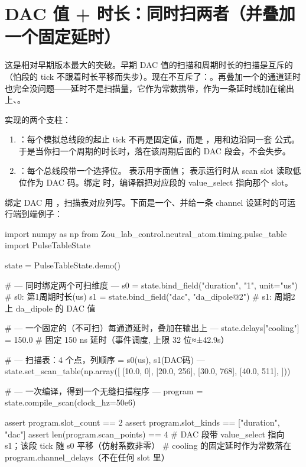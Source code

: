 \documentclass[11pt,oneside,openany]{book}
\begin{document}
\section{DAC 值 + 时长：同时扫两者（并叠加一个固定延时）}

这是相对早期版本最大的突破。早期 DAC 值的扫描和周期时长的扫描是互斥的（怕段的 tick 不跟着时长平移而失步）。现在不互斥了：。再叠加一个的通道延时也完全没问题——延时不是扫描量，它作为常数携带，作为一条延时线加在输出上、。

实现的两个支柱：

\begin{enumerate}
\item {}：每个模拟总线段的起止 tick 不再是固定值，而是 ，用和边沿同一套  公式。于是当你扫一个周期的时长时，落在该周期后面的 DAC 段会，不会失步。
\item {}：每个总线段带一个选择位。 表示用字面值； 表示运行时从 scan slot  读取低位作为 DAC 码。绑定  时，编译器把对应段的 value\_select 指向那个 slot。
\end{enumerate}

绑定 DAC 用 ，扫描表对应列写。下面是一个、并给一条 channel 设延时的可运行端到端例子：

\begin{codeblock}[Python]
import numpy as np
from Zou_lab_control.neutral_atom.timing.pulse_table import PulseTableState

state = PulseTableState.demo()

# --- 同时绑定两个可扫维度 ---
s0 = state.bind_field("duration", "1", unit="us")   # s0: 第1周期时长(us)
s1 = state.bind_field("dac", "da_dipole@2")         # s1: 周期2 上 da_dipole 的 DAC 值

# --- 一个固定的（不可扫）每通道延时，叠加在输出上 ---
state.delays["cooling"] = 150.0                     # 固定 150 ns 延时（事件调度, 上限 32 位≈±42.9s）

# --- 扫描表：4 个点，列顺序 = s0(us), s1(DAC码) ---
state.set_scan_table(np.array([
    [10.0,    0],
    [20.0,  256],
    [30.0,  768],
    [40.0, 511],
]))

# --- 一次编译，得到一个无缝扫描程序 ---
program = state.compile_scan(clock_hz=50e6)

assert program.slot_count == 2
assert program.slot_kinds == ["duration", "dac"]
assert len(program.scan_points) == 4
# DAC 段带 value_select 指向 s1；该段 tick 随 s0 平移（仿射系数非零）
# cooling 的固定延时作为常数落在 program.channel_delays（不在任何 slot 里）
\end{codeblock}
\end{document}
